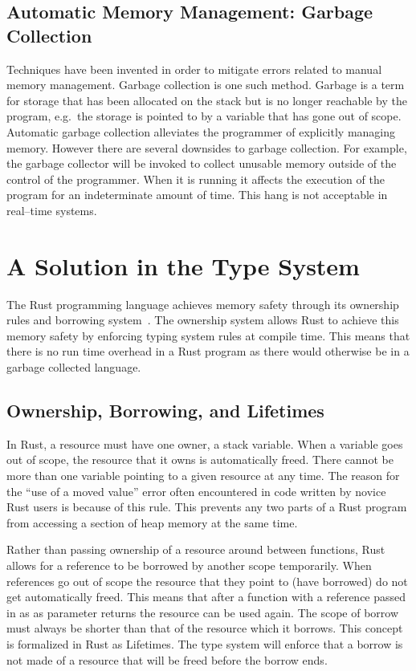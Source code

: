

\subsection{Automatic Memory Management: Garbage Collection}
Techniques have been invented in order to mitigate errors related to manual
memory management. Garbage collection is one such method.  Garbage is a term
for storage that has been allocated on the stack but is no longer reachable by
the program, e.g.\ the storage is pointed to by a variable that has gone out of
scope. Automatic garbage collection alleviates the programmer of explicitly
managing memory. However there are several downsides to garbage collection. For
example, the garbage collector will be invoked to collect unusable memory
outside of the control of the programmer. When it is running it affects the
execution of the program for an indeterminate amount of time. This hang is not
acceptable in real--time systems.

\section{A Solution in the Type System}
The Rust programming language achieves memory safety through its ownership
rules and borrowing system~\cite{rust-borrowing}. The ownership system allows
Rust to achieve this memory safety by enforcing typing system rules at compile
time. This means that there is no run time overhead in a Rust program as there
would otherwise be in a garbage collected language.

\subsection{Ownership, Borrowing, and Lifetimes} \label{sec:regions}
In Rust, a resource must have one owner, a stack variable. When a variable goes
out of scope, the resource that it owns is automatically freed. There cannot
be more than one variable pointing to a given resource at any time. The reason
for the ``use of a moved value'' error often encountered in code written
by novice Rust users is because of this rule. This prevents any two parts
of a Rust program from accessing a section of heap memory at the same time.

Rather than passing ownership of a resource around between functions, Rust
allows for a reference to be borrowed by another scope temporarily. When
references go out of scope the resource that they point to (have borrowed) do
not get automatically freed. This means that after a function with a
reference passed in as as parameter returns the resource can be used again.
The scope of borrow must always be shorter than that of the resource which it
borrows. This concept is formalized in Rust as Lifetimes. The type system will
enforce that a borrow is not made of a resource that will be freed before the
borrow ends.

